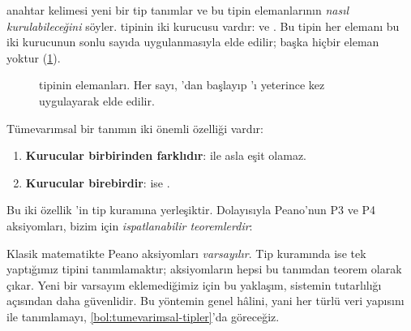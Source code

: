 
\noindent {} anahtar kelimesi yeni bir tip tanımlar ve
bu tipin elemanlarının \emph{nasıl kurulabileceğini} söyler. 
tipinin iki kurucusu vardır:  ve . Bu tipin her elemanı
bu iki kurucunun sonlu sayıda uygulanmasıyla elde edilir; başka hiçbir
eleman yoktur (\cref{fig:dogal-zincir}).

\begin{figure}[htbp]
\centering
{}
\caption{ tipinin elemanları. Her sayı, 'dan başlayıp
'ı yeterince kez uygulayarak elde edilir.}
\label{fig:dogal-zincir}
\end{figure}

Tümevarımsal bir tanımın iki önemli özelliği vardır:
\begin{enumerate}[label=(\roman*)]
  \item \textbf{Kurucular birbirinden farklıdır}:  ile
         asla eşit olamaz.
  \item \textbf{Kurucular birebirdir}:  ise .
\end{enumerate}

\noindent Bu iki özellik \Lean{}'in tip kuramına yerleşiktir. Dolayısıyla
Peano'nun P3 ve P4 aksiyomları, bizim için \emph{ispatlanabilir
teoremlerdir}:


\begin{onemlifikir}
Klasik matematikte Peano aksiyomları \emph{varsayılır}. Tip kuramında
ise tek yaptığımız  tipini tanımlamaktır; aksiyomların hepsi
bu tanımdan teorem olarak çıkar. Yeni bir varsayım eklemediğimiz için
bu yaklaşım, sistemin tutarlılığı açısından daha güvenlidir. Bu yöntemin
genel hâlini, yani her türlü veri yapısını  ile
tanımlamayı, \cref{bol:tumevarimsal-tipler}'da göreceğiz.
\end{onemlifikir}


